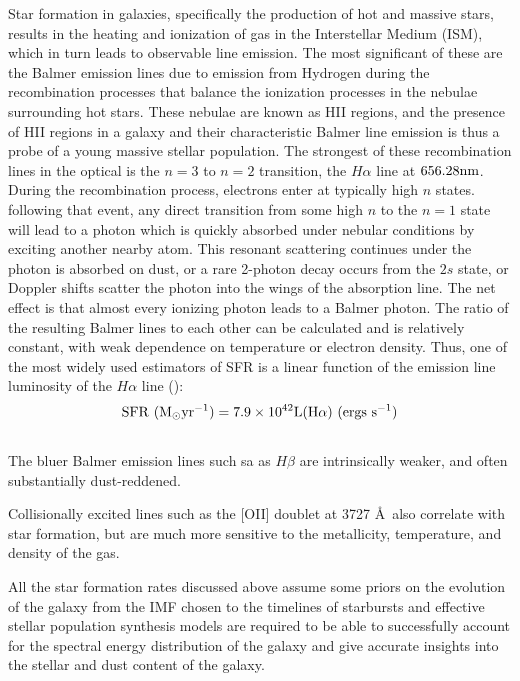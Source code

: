 Star formation in galaxies, specifically the production of hot and
massive stars, results in the heating and ionization of gas in the
Interstellar Medium (ISM), which in turn leads to observable line
emission.  The most significant of these are the Balmer emission lines
due to emission from Hydrogen during the recombination processes that
balance the ionization processes in the nebulae surrounding hot
stars. These nebulae are known as HII regions, and the presence of HII
regions in a galaxy and their characteristic Balmer line emission is
thus a probe of a young massive stellar population. The strongest of
these recombination lines in the optical is the $n=3$ to $n=2$
transition, the $H\alpha$ line at $656.28 {\rm nm}$. During the
recombination process, electrons enter at typically high $n$ states.
following that event, any direct transition from some high $n$ to the
$n=1$ state will lead to a photon which is quickly absorbed under
nebular conditions by exciting another nearby atom. This resonant
scattering continues under the photon is absorbed on dust, or a rare
2-photon decay occurs from the $2s$ state, or Doppler shifts scatter
the photon into the wings of the absorption line. The net effect is
that almost every ionizing photon leads to a Balmer photon. The ratio
of the resulting Balmer lines to each other can be calculated and is
relatively constant, with weak dependence on temperature or electron
density.  Thus, one of the most widely used estimators of SFR is a
linear function of the emission line luminosity of the $H\alpha$ line
(\citet{1994ApJ...435...22K, 1998ApJ...498..106M}):
$${\rm SFR}\hbox{ }({\rm M}_{\odot} {\rm yr}^{-1}) = 7.9 \times 10^{42} {\rm L}({\rm H}\alpha) \hbox{ }({\rm ergs }\hbox{ } {\rm s}^{-1})$$\\
The bluer Balmer emission lines  such sa
as $H\beta$ are intrinsically weaker, and often substantially
dust-reddened. 

Collisionally excited lines such as the [OII] doublet at 3727
\AA\ also correlate with star formation, but are much more sensitive
to the metallicity, temperature, and density of the gas.

All the star formation rates discussed above assume some priors on the
evolution of the galaxy from the IMF chosen to the timelines of
starbursts and effective stellar population synthesis models are
required to be able to successfully account for the spectral energy
distribution of the galaxy and give accurate insights into the stellar
and dust content of the galaxy.\\

